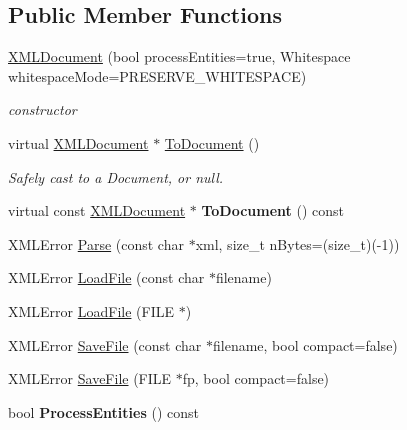 \subsection*{Public Member Functions}
\begin{DoxyCompactItemize}
\item 
\hyperlink{classtinyxml2_1_1XMLDocument_a57ddf17b6e054dda10af98991b1b8f70}{X\+M\+L\+Document} (bool process\+Entities=true, Whitespace whitespace\+Mode=P\+R\+E\+S\+E\+R\+V\+E\+\_\+\+W\+H\+I\+T\+E\+S\+P\+A\+CE)\hypertarget{classtinyxml2_1_1XMLDocument_a57ddf17b6e054dda10af98991b1b8f70}{}\label{classtinyxml2_1_1XMLDocument_a57ddf17b6e054dda10af98991b1b8f70}

\begin{DoxyCompactList}\small\item\em constructor \end{DoxyCompactList}\item 
virtual \hyperlink{classtinyxml2_1_1XMLDocument}{X\+M\+L\+Document} $\ast$ \hyperlink{classtinyxml2_1_1XMLDocument_a3e185f880882bd978367bb55937735ec}{To\+Document} ()\hypertarget{classtinyxml2_1_1XMLDocument_a3e185f880882bd978367bb55937735ec}{}\label{classtinyxml2_1_1XMLDocument_a3e185f880882bd978367bb55937735ec}

\begin{DoxyCompactList}\small\item\em Safely cast to a Document, or null. \end{DoxyCompactList}\item 
virtual const \hyperlink{classtinyxml2_1_1XMLDocument}{X\+M\+L\+Document} $\ast$ {\bfseries To\+Document} () const \hypertarget{classtinyxml2_1_1XMLDocument_a15eb1a62afa18c66808031da647d1129}{}\label{classtinyxml2_1_1XMLDocument_a15eb1a62afa18c66808031da647d1129}

\item 
X\+M\+L\+Error \hyperlink{classtinyxml2_1_1XMLDocument_a1819bd34f540a7304c105a6232d25a1f}{Parse} (const char $\ast$xml, size\+\_\+t n\+Bytes=(size\+\_\+t)(-\/1))
\item 
X\+M\+L\+Error \hyperlink{classtinyxml2_1_1XMLDocument_a2ebd4647a8af5fc6831b294ac26a150a}{Load\+File} (const char $\ast$filename)
\item 
X\+M\+L\+Error \hyperlink{classtinyxml2_1_1XMLDocument_a5f1d330fad44c52f3d265338dd2a6dc2}{Load\+File} (F\+I\+LE $\ast$)
\item 
X\+M\+L\+Error \hyperlink{classtinyxml2_1_1XMLDocument_a73ac416b4a2aa0952e841220eb3da18f}{Save\+File} (const char $\ast$filename, bool compact=false)
\item 
X\+M\+L\+Error \hyperlink{classtinyxml2_1_1XMLDocument_a8b95779479a0035acc67b3a61dfe1b74}{Save\+File} (F\+I\+LE $\ast$fp, bool compact=false)
\item 
bool {\bfseries Process\+Entities} () const \hypertarget{classtinyxml2_1_1XMLDocument_adfcff7d0599cd520e9fcbb8891e1b678}{}\label{classtinyxml2_1_1XMLDocument_adfcff7d0599cd520e9fcbb8891e1b678}


\end{DoxyCompactItemize}
